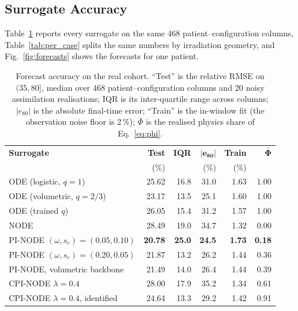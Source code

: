 
\subsection{Surrogate Accuracy}
\label{sec:results_main}

Table~\ref{tab:main_results} reports every surrogate on the same
$468$ patient--configuration columns, Table~\ref{tab:per_case} splits the
same numbers by irradiation geometry, and Fig.~\ref{fig:forecasts} shows the
forecasts for one patient.

\begin{table}[H]
\caption{Forecast accuracy on the real cohort. ``Test'' is the relative RMSE on
$(35,80]$, median over $468$ patient--configuration columns and 20 noisy
assimilation realisations; IQR is its inter-quartile range across columns;
$|e_{80}|$ is the absolute final-time error; ``Train'' is the in-window fit
(the observation noise floor is 2\,\%); $\bar\Phi$ is the realised physics
share of Eq.~\eqref{eq:phi}.}
\label{tab:main_results}
\centering\scriptsize
\setlength{\tabcolsep}{4pt}
%
\begin{tabular}{lrrrrr}
\hline
\textbf{Surrogate} & \textbf{Test} & \textbf{IQR} & $\bm{|e_{80}|}$ & \textbf{Train} & $\bm{\bar\Phi}$ \\
 & (\%) & & (\%) & (\%) & \\
\hline
ODE (logistic, $q{=}1$) & 25.62 & 16.8 & 31.0 & 1.63 & 1.00 \\
ODE (volumetric, $q{=}2/3$) & 23.17 & 13.5 & 25.1 & 1.60 & 1.00 \\
ODE (trained $q$) & 26.05 & 15.4 & 31.2 & 1.57 & 1.00 \\
NODE & 28.49 & 19.0 & 34.7 & 1.32 & 0.00 \\
PI-NODE $(\omega,s_r){=}(0.05,0.10)$ & \textbf{20.78} & \textbf{25.0} & \textbf{24.5} & \textbf{1.73} & \textbf{0.18} \\
PI-NODE $(\omega,s_r){=}(0.20,0.05)$ & 21.87 & 13.2 & 26.2 & 1.44 & 0.36 \\
PI-NODE, volumetric backbone & 21.49 & 14.0 & 26.4 & 1.44 & 0.39 \\
CPI-NODE $\lambda{=}0.4$ & 28.00 & 17.9 & 35.2 & 1.34 & 0.61 \\
CPI-NODE $\lambda{=}0.4$, identified & 24.64 & 13.3 & 29.2 & 1.42 & 0.91 \\

\end{tabular}
\end{table}
